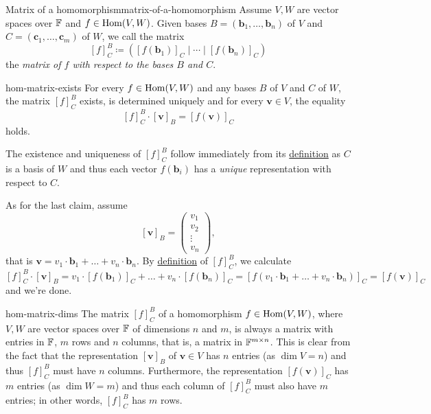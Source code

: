 \begin{definition}{Matrix of a homomorphism}{matrix-of-a-homomorphism}
 Assume $V,W$ are vector spaces over $\mathbb{F}$ and $f \in \operatorname{Hom}(V,W)$. Given bases $B
 = (\mathbf{b}_1,\ldots,\mathbf{b}_n)$ of $V$ and $C =
 (\mathbf{c}_1,\ldots,\mathbf{c}_m)$ of $W$, we call the matrix
 \[
  [f]^{B}_C \coloneqq ([f(\mathbf{b}_1)]_C \mid \cdots \mid [f(\mathbf{b}_n)]_C)
 \]
 the \emph{matrix of $f$ with respect to the bases $B$ and $C$}.
\end{definition}

\begin{proposition}{}{hom-matrix-exists}
 For every $f \in \operatorname{Hom}(V,W)$ and any bases $B$ of $V$ and $C$ of $W$, the matrix
 $[f]_C^{B}$ exists, is determined uniquely and for every $\mathbf{v} \in V$,
 the equality
 \[
  [f]_C^{B} \cdot [\mathbf{v}]_B = [f(\mathbf{v})]_C
 \]
 holds.
\end{proposition}
\begin{propproof}
 The existence and uniqueness of $[f]_C^{B}$ follow immediately from its
 \hyperref[def:matrix-of-a-homomorphism]{definition} as $C$ is a basis of $W$
 and thus each vector $f(\mathbf{b}_i)$ has a \emph{unique} representation with
 respect to $C$.

 As for the last claim, assume
 \[
  [\mathbf{v}]_B =
  \begin{pmatrix}
   v_1\\
   v_2\\
   \vdots\\
   v_n
  \end{pmatrix},
 \]
 that is $\mathbf{v} = v_1 \cdot \mathbf{b}_1 + \ldots + v_n \cdot
 \mathbf{b}_n$. By \hyperref[def:matrix-of-a-homomorphism]{definition} of
 $[f]_C^{B}$, we calculate
 \[
  [f]_C^{B} \cdot [\mathbf{v}]_B = v_1 \cdot [f(\mathbf{b}_1)]_C + \ldots +
  v_n \cdot [f(\mathbf{b}_n)]_C = [f(v_1 \cdot \mathbf{b}_1 + \ldots + v_n \cdot
  \mathbf{b}_n)]_C = [f(\mathbf{v})]_C
 \]
 and we're done.
\end{propproof}

\begin{remark}{}{hom-matrix-dims}
 The matrix $[f]_C^{B}$ of a homomorphism $f \in \operatorname{Hom}(V,W)$, where $V,W$ are
 vector spaces over $\mathbb{F}$ of dimensions $n$ and $m$, is always a matrix with
 entries in $\mathbb{F}$, $m$ rows and $n$ columns, that is, a matrix in $\mathbb{F}^{m \times
 n}$. This is clear from the fact that the representation $[\mathbf{v}]_B$ of
 $\mathbf{v} \in V$ has $n$ entries (as $\dim V = n$) and thus $[f]_C^{B}$ must
 have $n$ columns. Furthermore, the representation $[f(\mathbf{v})]_C$ has $m$
 entries (as $\dim W = m$) and thus each column of $[f]_C^{B}$ must also have
 $m$ entries; in other words, $[f]_C^{B}$ has $m$ rows.
\end{remark}

